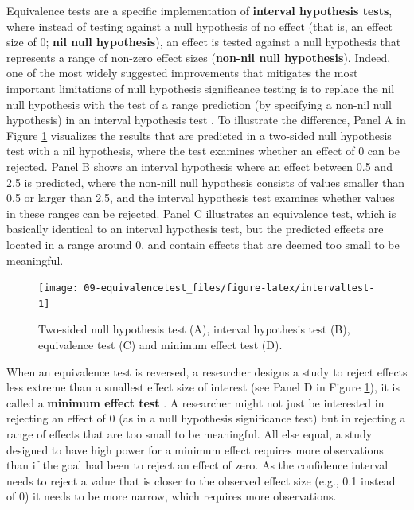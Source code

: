 \documentclass[
  oneside]{krantz}
\begin{document}
Equivalence tests are a specific implementation of \textbf{interval hypothesis tests}, where instead of testing against a null hypothesis of no effect (that is, an effect size of 0; \textbf{nil null hypothesis}), an effect is tested against a null hypothesis that represents a range of non-zero effect sizes (\textbf{non-nil null hypothesis}). Indeed, one of the most widely suggested improvements that mitigates the most important limitations of null hypothesis significance testing is to replace the nil null hypothesis with the test of a range prediction (by specifying a non-nil null hypothesis) in an interval hypothesis test \citep{lakens_practical_2021}. To illustrate the difference, Panel A in Figure \ref{fig:intervaltest} visualizes the results that are predicted in a two-sided null hypothesis test with a nil hypothesis, where the test examines whether an effect of 0 can be rejected. Panel B shows an interval hypothesis where an effect between 0.5 and 2.5 is predicted, where the non-nill null hypothesis consists of values smaller than 0.5 or larger than 2.5, and the interval hypothesis test examines whether values in these ranges can be rejected. Panel C illustrates an equivalence test, which is basically identical to an interval hypothesis test, but the predicted effects are located in a range around 0, and contain effects that are deemed too small to be meaningful.



\begin{figure}

{\centering \texttt{[image: 09-equivalencetest\_files/figure-latex/intervaltest-1]} 

}

\caption{Two-sided null hypothesis test (A), interval hypothesis test (B), equivalence test (C) and minimum effect test (D).}\label{fig:intervaltest}
\end{figure}

When an equivalence test is reversed, a researcher designs a study to reject effects less extreme than a smallest effect size of interest (see Panel D in Figure \ref{fig:intervaltest}), it is called a \textbf{minimum effect test} \citep{murphy_testing_1999}. A researcher might not just be interested in rejecting an effect of 0 (as in a null hypothesis significance test) but in rejecting a range of effects that are too small to be meaningful. All else equal, a study designed to have high power for a minimum effect requires more observations than if the goal had been to reject an effect of zero. As the confidence interval needs to reject a value that is closer to the observed effect size (e.g., 0.1 instead of 0) it needs to be more narrow, which requires more observations.
\end{document}
